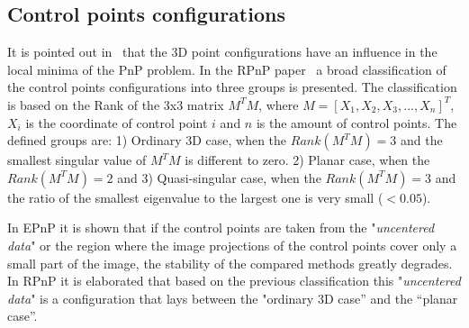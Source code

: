\documentclass[letterpaper, 10 pt, conference]{ieeeconf}  %
\begin{document}
\subsection{Control points configurations}


It is pointed out in~\cite{Lepetit2008,Li2012} that the 3D point configurations have an influence in the local minima of the PnP problem. In the RPnP paper~\cite{Li2012} a broad classification of the control points configurations into three groups is presented. The classification is based on the Rank of the 3x3 matrix $M^TM$, where $M = [X_1, X_2, X_3, ... ,X_n]^T$, $X_i$ is the coordinate of control point $i$ and $n$ is the amount of control points. The defined groups are: 1) Ordinary 3D case, when the $Rank(M^TM) = 3$  and the smallest singular value of $M^TM$ is different to zero. 2) Planar case, when the $Rank(M^TM) = 2$ and 3) Quasi-singular case, when the $Rank(M^TM) = 3$ and the ratio of the smallest eigenvalue to the largest one is very small ($< 0.05$). 

In EPnP it is shown that if the control points are taken from the "\textit{uncentered data}" or the region where the image projections of the control points cover only a small part of the image, the stability of the compared methods greatly degrades. In RPnP it is elaborated that based on the previous classification this "\textit{uncentered data}" is a configuration that lays between the "ordinary 3D case” and the “planar case”.





\end{document}
